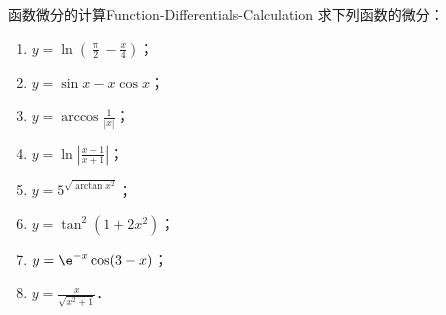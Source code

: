 \begin{problem}{函数微分的计算}{Function-Differentials-Calculation}
    求下列函数的微分：
    \begin{enumerate}
        \item $y = \ln\left( \frac{\uppi}{2} - \frac{x}{4} \right)$；
        \item $y = \sin x - x \cos x$；
        \item $y = \arccos \frac{1}{|x|}$；
        \item $y = \ln\left| \frac{x-1}{x+1} \right|$；
        \item $y = 5^{\sqrt{\arctan x^2}}$；
        \item $y = \tan^2(1 + 2x^2)$；
        \item $y = \e^{-x}\cos(3 - x)$；
        \item $y = \frac{x}{\sqrt{x^2+1}}$．
    \end{enumerate}
\end{problem}

